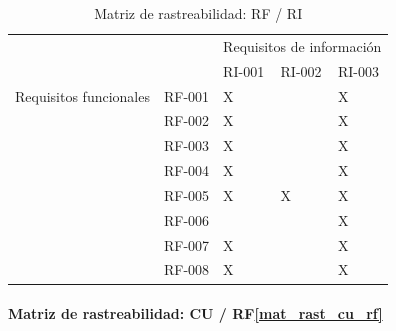 \begin{table}[htpb]
\centering
\begin{tabular}{|l|l|l|l|l|}
\hline
\multicolumn{2}{|l|}{\multirow{2}{*}{}} & \multicolumn{3}{l|}{Requisitos de información} \\ \cline{3-5} 
\multicolumn{2}{|l|}{}                  & RI-001         & RI-002        & RI-003        \\ \hline
Requisitos funcionales     & RF-001     & X              &               & X             \\ \hline
\multirow{7}{*}{}          & RF-002     & X              &               & X             \\ \cline{2-5} 
                           & RF-003     & X              &               & X             \\ \cline{2-5} 
                           & RF-004     & X              &               & X             \\ \cline{2-5} 
                           & RF-005     & X              & X             & X             \\ \cline{2-5} 
                           & RF-006     &                &               & X             \\ \cline{2-5} 
                           & RF-007     & X              &               & X             \\ \cline{2-5} 
                           & RF-008     & X              &               & X             \\ \hline
\end{tabular}
\caption{Matriz de rastreabilidad: RF / RI}
\label{mat_rast_rf_ri}
\end{table}


\paragraph{Matriz de rastreabilidad: CU / RF\ref{mat_rast_cu_rf}}

